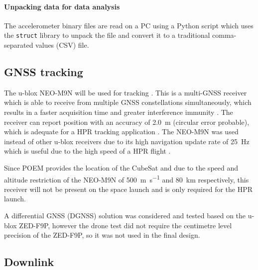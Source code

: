 \documentclass[draft]{report}
\begin{document}
\paragraph{Unpacking data for data analysis}

The accelerometer binary files are read on a PC using a Python script which uses the \texttt{struct} library to unpack the file and convert it to a traditional comma-separated values (CSV) file.

\subsection{GNSS tracking}

The u-blox NEO-M9N will be used for tracking \cite{ublox2023neo_m9n_datasheet}. This is a multi-GNSS receiver which is able to receive from multiple GNSS constellations simultaneously, which results in a faster acquisition time and greater interference immunity \cite{ublox2023neo_m9n_datasheet}. The receiver can report position with an accuracy of \SI{2.0}{\metre} (circular error probable), which is adequate for a HPR tracking application \cite{ublox2023neo_m9n_datasheet}. The NEO-M9N was used instead of other u-blox receivers due to its high navigation update rate of \SI{25}{\hertz} which is useful due to the high speed of a HPR flight \cite{ublox2023neo_m9n_datasheet}.

Since POEM provides the location of the CubeSat and due to the speed and altitude restriction of the NEO-M9N of \SI{500}{\metre\per\second} and \SI{80}{\kilo\metre} respectively, this receiver will not be present on the space launch and is only required for the HPR launch.

A differential GNSS (DGNSS) solution was considered and tested based on the u-blox ZED-F9P, however the drone test did not require the centimetre level precision of the ZED-F9P, so it was not used in the final design.


\subsection{Downlink}



\end{document}
